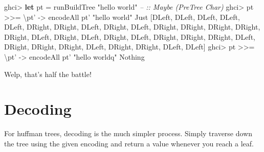 \documentclass[]{article}
\newenvironment{Shaded}{}{}
\newcommand{\KeywordTok}[1]{\textcolor[rgb]{0.00,0.44,0.13}{\textbf{{#1}}}}
\newcommand{\DataTypeTok}[1]{\textcolor[rgb]{0.56,0.13,0.00}{{#1}}}
\newcommand{\StringTok}[1]{\textcolor[rgb]{0.25,0.44,0.63}{{#1}}}
\newcommand{\CommentTok}[1]{\textcolor[rgb]{0.38,0.63,0.69}{\textit{{#1}}}}
\newcommand{\OtherTok}[1]{\textcolor[rgb]{0.00,0.44,0.13}{{#1}}}
\newcommand{\FunctionTok}[1]{\textcolor[rgb]{0.02,0.16,0.49}{{#1}}}
\newcommand{\NormalTok}[1]{{#1}}
\begin{document}
\begin{Shaded}
\begin{Highlighting}[]
\NormalTok{ghci}\FunctionTok{>} \KeywordTok{let} \NormalTok{pt }\FunctionTok{=} \NormalTok{runBuildTree }\StringTok{"hello world"}          \CommentTok{-- :: Maybe (PreTree Char)}
\NormalTok{ghci}\FunctionTok{>} \NormalTok{pt }\FunctionTok{>>=} \NormalTok{\textbackslash{}pt' }\OtherTok{->} \NormalTok{encodeAll pt' }\StringTok{"hello world"}
\DataTypeTok{Just} \NormalTok{[}\DataTypeTok{DLeft}\NormalTok{, }\DataTypeTok{DLeft}\NormalTok{, }\DataTypeTok{DLeft}\NormalTok{, }\DataTypeTok{DLeft}\NormalTok{, }\DataTypeTok{DLeft}\NormalTok{, }\DataTypeTok{DRight}\NormalTok{, }\DataTypeTok{DRight}\NormalTok{, }\DataTypeTok{DLeft}\NormalTok{, }\DataTypeTok{DRight}\NormalTok{, }\DataTypeTok{DLeft}\NormalTok{,}
\DataTypeTok{DRight}\NormalTok{, }\DataTypeTok{DRight}\NormalTok{, }\DataTypeTok{DRight}\NormalTok{, }\DataTypeTok{DRight}\NormalTok{, }\DataTypeTok{DRight}\NormalTok{, }\DataTypeTok{DLeft}\NormalTok{, }\DataTypeTok{DRight}\NormalTok{, }\DataTypeTok{DLeft}\NormalTok{, }\DataTypeTok{DRight}\NormalTok{, }\DataTypeTok{DLeft}\NormalTok{,}
\DataTypeTok{DRight}\NormalTok{, }\DataTypeTok{DRight}\NormalTok{, }\DataTypeTok{DRight}\NormalTok{, }\DataTypeTok{DLeft}\NormalTok{, }\DataTypeTok{DRight}\NormalTok{, }\DataTypeTok{DRight}\NormalTok{, }\DataTypeTok{DRight}\NormalTok{, }\DataTypeTok{DLeft}\NormalTok{, }\DataTypeTok{DRight}\NormalTok{, }\DataTypeTok{DRight}\NormalTok{,}
\DataTypeTok{DLeft}\NormalTok{, }\DataTypeTok{DLeft}\NormalTok{]}
\NormalTok{ghci}\FunctionTok{>} \NormalTok{pt }\FunctionTok{>>=} \NormalTok{\textbackslash{}pt' }\OtherTok{->} \NormalTok{encodeAll pt' }\StringTok{"hello worldq"}
\DataTypeTok{Nothing}
\end{Highlighting}
\end{Shaded}

Welp, that's half the battle!

\section{Decoding}\label{decoding}

For huffman trees, decoding is the much simpler process. Simply traverse
down the tree using the given encoding and return a value whenever you
reach a leaf.
\end{document}
